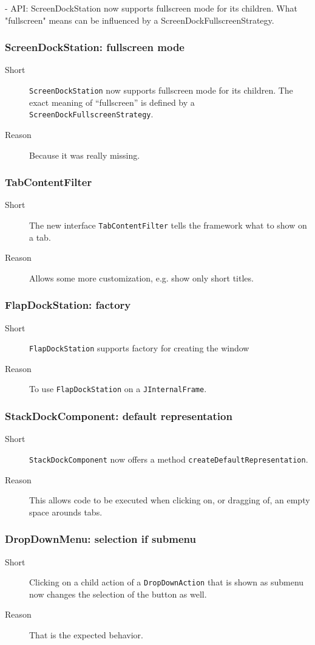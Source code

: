 \documentclass[a4paper,10pt]{article}
\newcommand{\src}[1]{\lstinline[basicstyle=\normalsize\ttfamily,keywordstyle=\normalsize\ttfamily,identifierstyle=\normalsize\ttfamily]|#1|}
\newcommand{\short}{\item[Short]}
\newcommand{\why}{\item[Reason]}
\begin{document}
- API: ScreenDockStation now supports fullscreen mode for its children. What "fullscreen" means can be influenced by a ScreenDockFullscreenStrategy.

\subsubsection{ScreenDockStation: fullscreen mode}
\begin{description}
 \short \src{ScreenDockStation} now supports fullscreen mode for its children. The exact meaning of ``fullscreen'' is defined by a \linebreak \src{ScreenDockFullscreenStrategy}.
 \why Because it was really missing.
\end{description}

\subsubsection{TabContentFilter}
\begin{description}
 \short The new interface \src{TabContentFilter} tells the framework what to show on a tab.
 \why Allows some more customization, e.g. show only short titles.
\end{description}

\subsubsection{FlapDockStation: factory}
\begin{description}
 \short \src{FlapDockStation} supports factory for creating the window 
 \why To use \src{FlapDockStation} on a \src{JInternalFrame}.
\end{description}

\subsubsection{StackDockComponent: default representation}
\begin{description}
 \short \src{StackDockComponent} now offers a method \linebreak \src{createDefaultRepresentation}.
 \why This allows code to be executed when clicking on, or dragging of, an empty space arounds tabs.
\end{description}

\subsubsection{DropDownMenu: selection if submenu}
\begin{description}
 \short Clicking on a child action of a \src{DropDownAction} that is shown as submenu now changes the selection of the button as well.
 \why That is the expected behavior.
\end{description}
\end{document}

